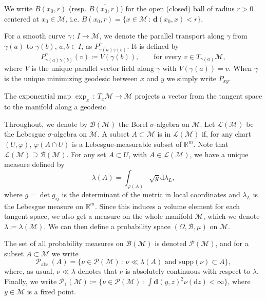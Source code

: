 \documentclass{article}
\newcommand{\CM}{\mathcal{M}}
\newcommand{\BR}{\mathbb{R}}
\newcommand{\rd}{\mathrm{d}}
\newcommand{\bd}{\mathbf{d}}
\DeclareMathOperator{\grad}{grad}
\begin{document}
We write $B(x_0,r)$ (resp. $\overline{B(x_0,r)}$) for the open (closed) ball of radius $r>0$ centered at $x_0\in\CM$, i.e. $B(x_0,r)=\{x\in\CM\,:\, \bd(x_0,x)<r\}$.



For a smooth curve $\gamma\,:\,I\to \CM $, we denote the parallel transport along $\gamma$ from $\gamma(a)$ to $\gamma(b)$, $a,b\in I$, as $P_{\gamma(a)\gamma(b)}^{\gamma}$. It is defined by
\begin{equation}
    P_{\gamma(a)\gamma(b)}^{\gamma}(v)\coloneqq V(\gamma(b)),\qquad \text{for every }v\in T_{\gamma(a)}\CM,
\end{equation}
where $V$ is the unique parallel vector field along $\gamma$ with $V(\gamma(a))=v$. When $\gamma$ is the unique minimizing geodesic between $x$ and $y$ we simply write $P_{xy}$.

The exponential map $\exp_x\,:\,T_x\CM\to\CM$ projects a vector from the tangent space to the manifold along a geodesic. 

Throughout, we denote by $\mathcal{B}(\CM)$ the Borel $\sigma$-algebra on $\CM$. Let $\mathcal{L}(\CM)$ be the Lebesgue $\sigma$-algebra on $\CM$. A subset $A\subset \CM$ is in $\mathcal{L}(\CM)$ if, for any chart $(U,\varphi)$, $\varphi(A\cap U)$ is a Lebesgue-measurable subset of $\BR^m$. Note that $\mathcal{L}(\CM)\supseteq \mathcal{B}(\CM)$. For any set $A\subset U$, with $A\in\mathcal{L}(\CM)$, we have a unique measure defined by
\begin{equation}
    \lambda(A)=\int_{\varphi(A)}\sqrt{g}\rd \lambda_L,
\end{equation}
where $g=\det g_{ij}$ is the determinant of the metric in local coordinates and $\lambda_L$ is the Lebesgue measure on $\BR^m$. Since this induces a volume element for each tangent space, we also get a measure on the whole manifold $\CM$, which we denote $\lambda\coloneqq \lambda(\CM)$. We can then define a probability space $(\Omega, \mathcal{B},\mu)$ on $\CM$. 

The set of all probability measures on $\mathcal{B}(\CM)$ is denoted $\mathcal{P}(\CM)$, and for a subset $A\subset \CM$ we write
\begin{equation}
    \mathcal{P}_{\text{abs.}}(A)=\{\nu\in\mathcal{P}(\CM)\,:\,\nu\ll \lambda(A) \text{ and } \text{supp}(\nu)\subset A\},
\end{equation}
where, as usual, $\nu\ll\lambda$ denotes that $\nu$ is absolutely continuous with respect to $\lambda$. Finally, we write $\mathcal{P}_1(\CM)\coloneqq \{\nu\in\mathcal{P}(\CM)\,:\,\int \bd(y,z)^2\nu(\rd z)<\infty\}$, where $y\in\CM$ is a fixed point.
\end{document}
